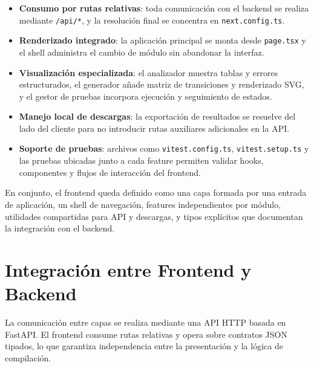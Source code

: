 \documentclass[12pt,a4paper]{article}
\begin{document}
\begin{itemize}[leftmargin=2em]
  \item \textbf{Consumo por rutas relativas}: toda comunicación con el backend se realiza mediante \texttt{/api/*}, y la resolución final se concentra en \texttt{next.config.ts}.
  \item \textbf{Renderizado integrado}: la aplicación principal se monta desde \texttt{page.tsx} y el shell administra el cambio de módulo sin abandonar la interfaz.
  \item \textbf{Visualización especializada}: el analizador muestra tablas y errores estructurados, el generador añade matriz de transiciones y renderizado SVG, y el gestor de pruebas incorpora ejecución y seguimiento de estados.
  \item \textbf{Manejo local de descargas}: la exportación de resultados se resuelve del lado del cliente para no introducir rutas auxiliares adicionales en la API.
  \item \textbf{Soporte de pruebas}: archivos como \texttt{vitest.config.ts}, \texttt{vitest.setup.ts} y las pruebas ubicadas junto a cada feature permiten validar hooks, componentes y flujos de interacción del frontend.
\end{itemize}

En conjunto, el frontend queda definido como una capa formada por una entrada de aplicación, un shell de navegación, features independientes por módulo, utilidades compartidas para API y descargas, y tipos explícitos que documentan la integración con el backend.

\section{Integración entre Frontend y Backend}

La comunicación entre capas se realiza mediante una API HTTP basada en FastAPI. El frontend consume rutas relativas y opera sobre contratos JSON tipados, lo que garantiza independencia entre la presentación y la lógica de compilación.
\end{document}
